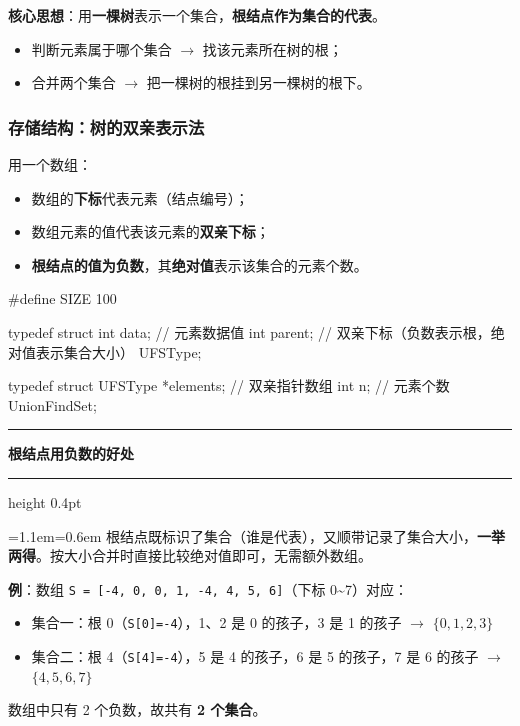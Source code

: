 \documentclass[11pt,openany,UTF8]{ctexbook}
\newcommand{\ctilde}{\ifmmode\tilde{}\else\textasciitilde{}\fi}
\newcommand{\callouthead}[2]{%
  \par\addvspace{7pt}\noindent
  {\color{#1}\rule[-0.15em]{3pt}{1.05em}}\hspace{0.5em}%
  {\bfseries\color{#1}#2}\par\nobreak\vspace{-0.35em}%
  {\color{rulesep}\hrule height 0.4pt}\nobreak\vspace{0.45em}%
  \begingroup\small\setlength{\parindent}{0pt}%
  \leftskip=1.1em\rightskip=0.6em\noindent\ignorespaces}
\newcommand{\calloutend}{\par\endgroup\addvspace{7pt}}
\newenvironment{callkey}[1]{\callouthead{keybar}{#1}}{\calloutend}
\begin{document}
\textbf{核心思想}：用\textbf{一棵树}表示一个集合，\textbf{根结点作为集合的代表}。

\begin{itemize}
\item 判断元素属于哪个集合 $\to$ 找该元素所在树的根；
\item 合并两个集合 $\to$ 把一棵树的根挂到另一棵树的根下。
\end{itemize}
\subsubsection{存储结构：树的双亲表示法}

用一个数组：

\begin{itemize}
\item 数组的\textbf{下标}代表元素（结点编号）；
\item 数组元素的值代表该元素的\textbf{双亲下标}；
\item \textbf{根结点的值为负数}，其\textbf{绝对值}表示该集合的元素个数。
\end{itemize}
\begin{codebox}
#define SIZE 100

typedef struct {
    int data;      // 元素数据值
    int parent;    // 双亲下标（负数表示根，绝对值表示集合大小）
} UFSType;

typedef struct {
    UFSType *elements;  // 双亲指针数组
    int n;              // 元素个数
} UnionFindSet;
\end{codebox}

\begin{callkey}{根结点用负数的好处}
根结点既标识了集合（谁是代表），又顺带记录了集合大小，\textbf{一举两得}。按大小合并时直接比较绝对值即可，无需额外数组。

\end{callkey}

\textbf{例}：数组 \texttt{S =\allowbreak{} [-4,\allowbreak{} 0,\allowbreak{} 0,\allowbreak{} 1,\allowbreak{} -4,\allowbreak{} 4,\allowbreak{} 5,\allowbreak{} 6]\allowbreak{}}（下标 0\ctilde{}7）对应：

\begin{itemize}
\item 集合一：根 0（\texttt{S[0]\allowbreak{}=\allowbreak{}-4}），1、2 是 0 的孩子，3 是 1 的孩子 $\to$ $\{0,1,2,3\}$
\item 集合二：根 4（\texttt{S[4]\allowbreak{}=\allowbreak{}-4}），5 是 4 的孩子，6 是 5 的孩子，7 是 6 的孩子 $\to$ $\{4,5,6,7\}$
\end{itemize}
数组中只有 2 个负数，故共有 \textbf{2 个集合}。
\end{document}

